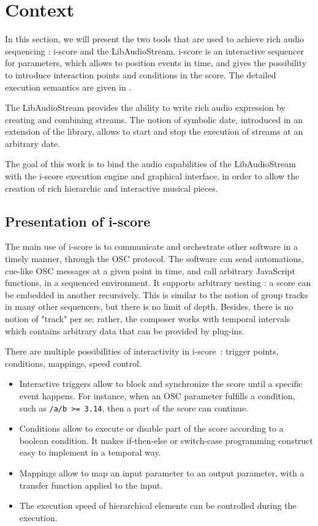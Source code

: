 \documentclass{article}
\begin{document}
\section{Context}
In this section, we will present the two tools that are used to achieve 
rich audio sequencing : i-score and the LibAudioStream.
i-score is an interactive sequencer for parameters, which allows to position events 
in time, and gives the possibility to introduce interaction points and 
conditions in the score.
The detailed execution semantics are given in \cite{celerier2015ossia}.

The LibAudioStream\cite{letzlibaudiostream} provides the ability to write rich audio expression
by creating and combining streams. The notion of symbolic date, introduced in an extension of the library,
allows to start and stop the execution of streams at an arbitrary date.

The goal of this work is to bind the audio capabilities of the LibAudioStream 
with the i-score execution engine and graphical interface, in order to allow 
the creation of rich hierarchic and interactive musical pieces.

\subsection{Presentation of i-score}
The main use of i-score is to communicate and orchestrate other software in a timely manner, 
through the OSC protocol.
The software can send automations, cue-like OSC messages at a given point in time, and call arbitrary JavaScript functions, in a sequenced environment.
It supports arbitrary nesting : a score can be embedded in another recursively.
This is similar to the notion of group tracks in many other sequencers, but 
there is no limit of depth. 
Besides, there is no notion of "track" per se; rather, the composer works with 
temporal intervals which contains arbitrary data that can be provided by plug-ins.

There are multiple possibilities of interactivity in i-score~: trigger points, conditions, 
mappings, speed control.
\begin{itemize}
    \item Interactive triggers allow to block and synchronize the score until a specific event happens.
    For instance, when an OSC parameter fulfills a condition, such as \lstinline|/a/b >= 3.14|, then 
    a part of the score can continue.
    \item Conditions allow to execute or disable part of the score according to a boolean condition.
    It makes if-then-else or switch-case programming construct easy to implement in a temporal way.
    \item Mappings allow to map an input parameter to an output parameter, with a transfer function applied to the input.
    \item The execution speed of hierarchical elements can be controlled during the execution.
\end{itemize}
\end{document}
